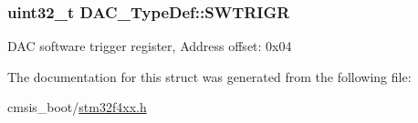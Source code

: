 \subsubsection[{\texorpdfstring{S\+W\+T\+R\+I\+GR}{SWTRIGR}}]{ uint32\+\_\+t D\+A\+C\+\_\+\+Type\+Def\+::\+S\+W\+T\+R\+I\+GR}\hypertarget{struct_d_a_c___type_def_a4ccb66068a1ebee1179574dda20206b6}{}\label{struct_d_a_c___type_def_a4ccb66068a1ebee1179574dda20206b6}
D\+AC software trigger register, Address offset\+: 0x04 

The documentation for this struct was generated from the following file\+:\begin{DoxyCompactItemize}
\item 
cmsis\+\_\+boot/\hyperlink{stm32f4xx_8h}{stm32f4xx.\+h}\end{DoxyCompactItemize}
